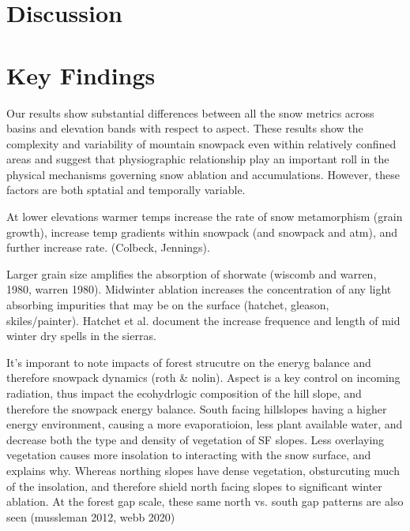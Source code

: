 \hypertarget{ch2-discussion}{\section{Discussion}\label{ch2-discussion}}
\hypertarget{ch2-discussion-1}{\section{Key Findings}\label{ch2-discussion-1}}



Our results show substantial differences between all the snow metrics across basins and elevation bands with respect to aspect. These results show the complexity and variability of mountain snowpack even within relatively confined areas and suggest that physiographic relationship play an important roll in the physical mechanisms governing snow ablation and accumulations. However, these factors are both sptatial and temporally variable.

At lower elevations warmer temps increase the rate of snow metamorphism (grain growth), increase temp gradients within snowpack (and snowpack and atm), and further increase rate. (Colbeck, Jennings). 

Larger grain size amplifies the absorption of shorwate (wiscomb and warren, 1980, warren 1980). Midwinter ablation increases the concentration of any light absorbing impurities that may be on the surface (hatchet, gleason, skiles/painter). Hatchet et al. document the increase frequence and length of mid winter dry spells in the sierras. 

It's imporant to note impacts of forest strucutre on the eneryg balance and therefore snowpack dynamics (roth \& nolin). Aspect is a key control on incoming radiation, thus impact the ecohydrlogic composition of the hill slope, and therefore the snowpack energy balance. South facing hillslopes having a higher energy environment, causing a more evaporatioion, less plant available water, and decrease both the type and density of vegetation of SF slopes. Less overlaying vegetation causes more insolation to interacting with the snow surface, and explains why. Whereas northing slopes have dense vegetation, obsturcuting much of the insolation, and therefore shield north facing slopes to significant winter ablation. At the forest gap scale, these same north vs. south gap patterns are also seen (mussleman 2012, webb 2020)


